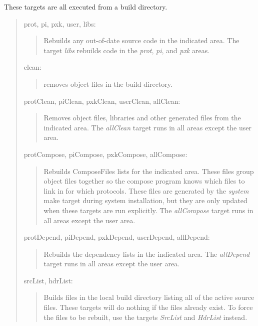  
These targets are all executed from a build directory.

\begin{quote}
prot, pi, pxk, user, libs:
\begin{quote}
	Rebuilds any out-of-date source code in the indicated area.
	The target {\em libs} rebuilds code in the {\em prot},
	{\em pi}, and {\em pxk} areas. 
\smallskip
\end{quote}

clean:
\begin{quote}
	removes object files in the build directory.
\smallskip
\end{quote}

protClean, piClean, pxkClean, userClean, allClean:
\begin{quote}
	Removes object files, libraries and other generated files from
	the indicated area.  The {\em allClean} target runs in all areas
	except the user area.
\smallskip
\end{quote}

protCompose, piCompose, pxkCompose, allCompose:
\begin{quote}
	Rebuilds ComposeFiles lists for the indicated area.  These
	files group object files together so the compose program 
	knows which files to link in for which protocols.
	These files are generated by the {\em system} make target
	during system installation, but they
	are only updated when these targets are run explicitly. 
	The {\em allCompose} target runs in all areas except the user
	area. 
\smallskip
\end{quote}

protDepend, piDepend, pxkDepend, userDepend, allDepend:
\begin{quote}
	Rebuilds the dependency lists in the indicated area.
	The {\em allDepend} target runs in all areas except the user area. 
\smallskip
\end{quote}


srcList, hdrList:
\begin{quote}
	Builds files in the local build directory listing all of
	the active \xk{} source files.  These targets will do
	nothing if the files already exist.  To force the files to be
	rebuilt, use the targets {\em SrcList} and {\em HdrList}
	instead. 
\smallskip
\end{quote}


\end{quote}
